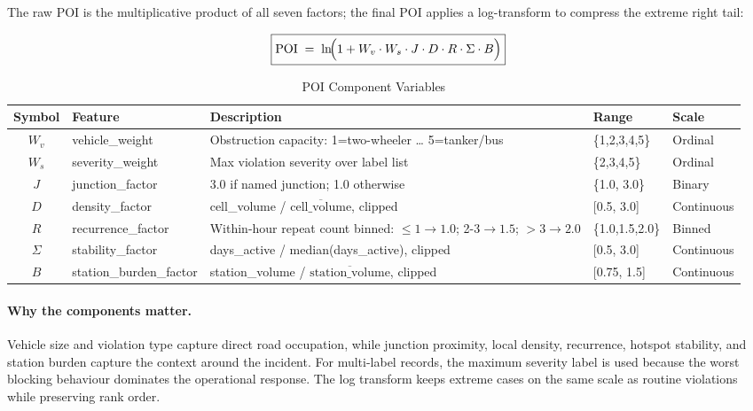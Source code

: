 \documentclass[12pt,a4paper]{article}
\begin{document}
The raw POI is the multiplicative product of all seven factors; the final POI applies a
log-transform to compress the extreme right tail:

\begin{equation}
\boxed{
\mathrm{POI} \;=\; \ln\!\Bigl(1 + W_v \cdot W_s \cdot J \cdot D \cdot R \cdot \Sigma \cdot B\Bigr)
}
\label{eq:poi}
\end{equation}

\begin{table}[htbp]
\centering
\caption{POI Component Variables}
\label{tab:poi}
\begin{tabularx}{\textwidth}{@{}clXll@{}}
\toprule
\textbf{Symbol} & \textbf{Feature} & \textbf{Description} & \textbf{Range} & \textbf{Scale}\\
\midrule
$W_v$ & vehicle\_weight   & Obstruction capacity: 1=two-wheeler \ldots{} 5=tanker/bus & \{1,2,3,4,5\}   & Ordinal\\
$W_s$ & severity\_weight  & Max violation severity over label list                    & \{2,3,4,5\}     & Ordinal\\
$J$   & junction\_factor  & 3.0 if named junction; 1.0 otherwise                      & \{1.0, 3.0\}    & Binary\\
$D$   & density\_factor   & cell\_volume / $\overline{\text{cell\_volume}}$, clipped  & [0.5, 3.0]      & Continuous\\
$R$   & recurrence\_factor& Within-hour repeat count binned: ${\le}1\to1.0$; 2-3$\to1.5$; ${>}3\to2.0$ & \{1.0,1.5,2.0\} & Binned\\
$\Sigma$ & stability\_factor & days\_active / median(days\_active), clipped           & [0.5, 3.0]      & Continuous\\
$B$   & station\_burden\_factor & station\_volume / $\overline{\text{station\_volume}}$, clipped & [0.75, 1.5] & Continuous\\
\bottomrule
\end{tabularx}
\end{table}

\paragraph{Why the components matter.}
Vehicle size and violation type capture direct road occupation, while junction proximity, local density, recurrence, hotspot stability, and station burden capture the context around the incident. For multi-label records, the maximum severity label is used because the worst blocking behaviour dominates the operational response. The log transform keeps extreme cases on the same scale as routine violations while preserving rank order.
\end{document}
